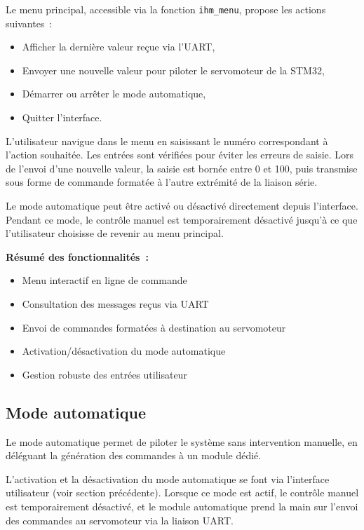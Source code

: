     Le menu principal, accessible via la fonction \texttt{ihm\_menu}, propose les actions suivantes~:
    \begin{itemize}
        \item Afficher la dernière valeur reçue via l'UART,
        \item Envoyer une nouvelle valeur pour piloter le servomoteur de la STM32,
        \item Démarrer ou arrêter le mode automatique,
        \item Quitter l'interface.
    \end{itemize}

    L'utilisateur navigue dans le menu en saisissant le numéro correspondant à l'action souhaitée. Les entrées sont vérifiées pour éviter les erreurs de saisie. Lors de l'envoi d'une nouvelle valeur, la saisie est bornée entre 0 et 100, puis transmise sous forme de commande formatée à l'autre extrémité de la liaison série.

    Le mode automatique peut être activé ou désactivé directement depuis l'interface. Pendant ce mode, le contrôle manuel est temporairement désactivé jusqu'à ce que l'utilisateur choisisse de revenir au menu principal.

    \vspace{0.5em}
    \noindent
    \textbf{Résumé des fonctionnalités~:}
    \begin{itemize}
        \item Menu interactif en ligne de commande
        \item Consultation des messages reçus via UART
        \item Envoi de commandes formatées à destination au servomoteur
        \item Activation/désactivation du mode automatique
        \item Gestion robuste des entrées utilisateur
    \end{itemize}

\subsection{Mode automatique}

    Le mode automatique permet de piloter le système sans intervention manuelle, en déléguant la génération des commandes à un module dédié. 

    L'activation et la désactivation du mode automatique se font via l'interface utilisateur (voir section précédente). Lorsque ce mode est actif, le contrôle manuel est temporairement désactivé, et le module automatique prend la main sur l'envoi des commandes au servomoteur via la liaison UART.

